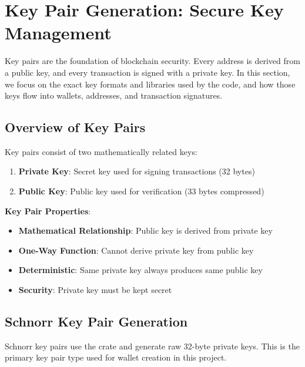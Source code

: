 \section{Key Pair Generation: Secure Key Management}
\label{sec:ch08-keypair-generation}

Key pairs are the foundation of blockchain security. Every address is derived from a public key, and every transaction is signed with a private key. In this section, we focus on the exact key formats and libraries used by the code, and how those keys flow into wallets, addresses, and transaction signatures.

\subsection{Overview of Key Pairs}
\label{sec:ch08-keypair-overview}

Key pairs consist of two mathematically related keys:

\begin{enumerate}
  \item \textbf{Private Key}: Secret key used for signing transactions (32 bytes)
  \item \textbf{Public Key}: Public key used for verification (33 bytes compressed)
\end{enumerate}

\textbf{Key Pair Properties}:
\begin{itemize}
  \item \textbf{Mathematical Relationship}: Public key is derived from private key
  \item \textbf{One-Way Function}: Cannot derive private key from public key
  \item \textbf{Deterministic}: Same private key always produces same public key
  \item \textbf{Security}: Private key must be kept secret
\end{itemize}

\subsection{Schnorr Key Pair Generation}
\label{sec:ch08-schnorr-keypair}

Schnorr key pairs use the  crate and generate raw 32-byte private keys. This is the primary key pair type used for wallet creation in this project.

